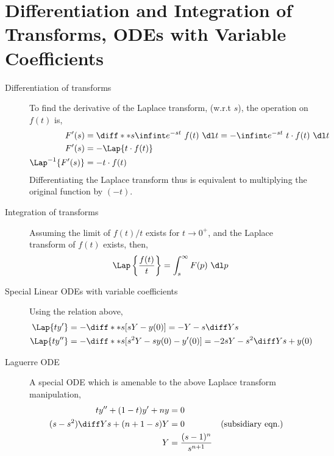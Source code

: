 \section{Differentiation and Integration of Transforms, ODEs with Variable Coefficients}
\begin{description}
    \item[Differentiation of transforms] To find the derivative of the Laplace transform,
        (w.r.t $ s $), the operation on $ f(t) $ is,
        \begin{align}
            F'(s)              & = \diff**{s}{\infint e^{-st}\ f(t)\ \dl t}
            = - \infint e^{-st}\ t \cdot f(t)\ \dl t                        \\
            F'(s)              & = -\Lap\{t \cdot f(t)\}                    \\
            \Lap^{-1}\{F'(s)\} & = -t \cdot f(t)
        \end{align}
        Differentiating the Laplace transform thus is equivalent to multiplying the
        original function by $ (-t) $.
    \item[Integration of transforms] Assuming the limit of $ f(t) / t $ exists for
        $ t \to 0^+ $, and the Laplace transform of $ f(t) $ exists, then,
        \begin{align}
            \Lap\left\{ \frac{f(t)}{t} \right\} & = \int_{s}^{\infty} F(p)\ \dl p \\
        \end{align}
    \item[Special Linear ODEs with variable coefficients] Using the relation above,
        \begin{align}
            \Lap\{ty'\}  & = -\diff**{s}{[sY - y(0)]} = -Y - s \diff Ys \\
            \Lap\{ty''\} & = -\diff**{s}{[s^2Y - sy(0) - y'(0)]}
            = -2sY - s^2 \diff Ys + y(0)
        \end{align}
    \item[Laguerre ODE] A special ODE which is amenable to the above Laplace transform
        manipulation,
        \begin{align}
            ty'' + (1 - t)y' + ny             & = 0                         \\
            (s - s^2) \diff Ys + (n + 1 - s)Y & = 0                       &
                                              & \text{(subsidiary eqn.)}    \\
            Y                                 & = \frac{(s-1)^n}{s^{n+1}}   \\

\end{align}
\end{description}
